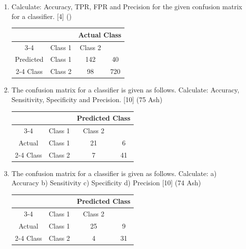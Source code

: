 \documentclass[12pt]{article}
\begin{document}
\begin{enumerate}[topsep=0pt, noitemsep]
      \item Calculate: Accuracy, TPR, FPR and Precision for the given confusion matrix for a classifier. \hfill [4] ()\\
        \small
        \begin{tabular}{|c|c|c|c|}
          \hline
          \multicolumn{2}{|c|}{} & \multicolumn{2}{c|}{Actual Class} \\ \cline{3-4}
          \multicolumn{2}{|c|}{} & Class 1 & Class 2 \\ \hline
          Predicted & Class 1 & 142 & 40 \\ \cline{2-4}
          Class & Class 2 & 98 & 720 \\ \hline
        \end{tabular}
        \normalsize

      \item The confusion matrix for a classifier is given as follows. Calculate: Accuracy, Sensitivity, Specificity and Precision. \hfill [10] (75 Ash)\\
        \small
        \begin{tabular}{|c|c|c|c|}
          \hline
          \multicolumn{2}{|c|}{} & \multicolumn{2}{c|}{Predicted Class} \\ \cline{3-4}
          \multicolumn{2}{|c|}{} & Class 1 & Class 2 \\ \hline
          Actual & Class 1 & 21 & 6 \\ \cline{2-4}
          Class & Class 2 & 7 & 41 \\ \hline
        \end{tabular}
        \normalsize

      \item The confusion matrix for a classifier is given as follows. Calculate: a) Accuracy \quad b) Sensitivity \quad c) Specificity \quad d) Precision \hfill [10] (74 Ash)\\
        \small
        \begin{tabular}{|c|c|c|c|}
          \hline
          \multicolumn{2}{|c|}{} & \multicolumn{2}{c|}{Predicted Class} \\ \cline{3-4}
          \multicolumn{2}{|c|}{} & Class 1 & Class 2 \\ \hline
          Actual & Class 1 & 25 & 9 \\ \cline{2-4}
          Class & Class 2 & 4 & 31 \\ \hline
        \end{tabular}
        \normalsize


\end{enumerate}
\end{document}
